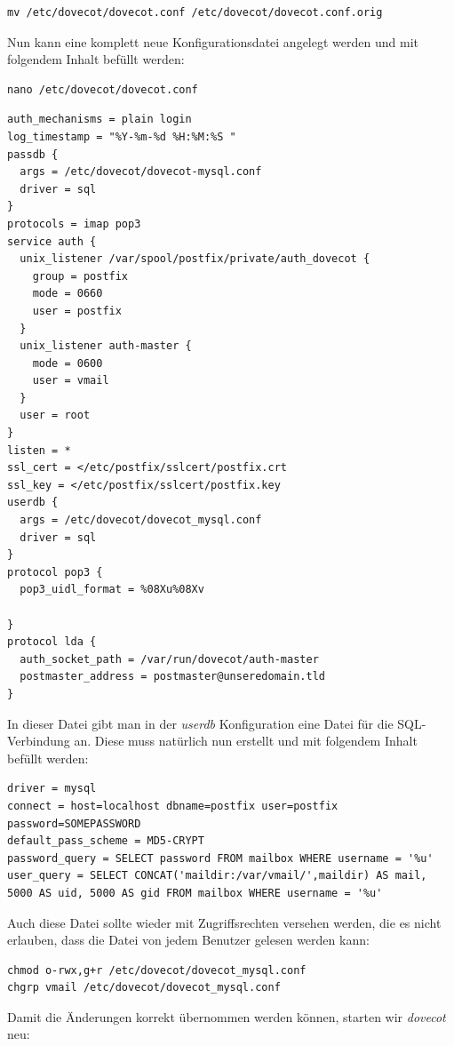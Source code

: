 \begin{lstlisting}
mv /etc/dovecot/dovecot.conf /etc/dovecot/dovecot.conf.orig
\end{lstlisting}

Nun kann eine komplett neue Konfigurationsdatei angelegt werden und mit folgendem Inhalt befüllt werden:

\begin{lstlisting}
nano /etc/dovecot/dovecot.conf
\end{lstlisting}

\begin{lstlisting}
auth_mechanisms = plain login
log_timestamp = "%Y-%m-%d %H:%M:%S "
passdb {
  args = /etc/dovecot/dovecot-mysql.conf
  driver = sql
}
protocols = imap pop3
service auth {
  unix_listener /var/spool/postfix/private/auth_dovecot {
    group = postfix
    mode = 0660
    user = postfix
  }
  unix_listener auth-master {
    mode = 0600
    user = vmail
  }
  user = root
}
listen = *
ssl_cert = </etc/postfix/sslcert/postfix.crt
ssl_key = </etc/postfix/sslcert/postfix.key
userdb {
  args = /etc/dovecot/dovecot_mysql.conf
  driver = sql
}
protocol pop3 {
  pop3_uidl_format = %08Xu%08Xv

}
protocol lda {
  auth_socket_path = /var/run/dovecot/auth-master
  postmaster_address = postmaster@unseredomain.tld
}
\end{lstlisting}

In dieser Datei gibt man in der \textit{userdb} Konfiguration eine Datei für die SQL-Verbindung an. Diese muss natürlich nun erstellt und mit folgendem Inhalt befüllt werden:

\begin{lstlisting}
driver = mysql
connect = host=localhost dbname=postfix user=postfix password=SOMEPASSWORD
default_pass_scheme = MD5-CRYPT
password_query = SELECT password FROM mailbox WHERE username = '%u'
user_query = SELECT CONCAT('maildir:/var/vmail/',maildir) AS mail, 5000 AS uid, 5000 AS gid FROM mailbox WHERE username = '%u'
\end{lstlisting}

Auch diese Datei sollte wieder mit Zugriffsrechten versehen werden, die es nicht erlauben, dass die Datei von jedem Benutzer gelesen werden kann:

\begin{lstlisting}
chmod o-rwx,g+r /etc/dovecot/dovecot_mysql.conf
chgrp vmail /etc/dovecot/dovecot_mysql.conf
\end{lstlisting}

Damit die Änderungen korrekt übernommen werden können, starten wir \textit{dovecot} neu:

